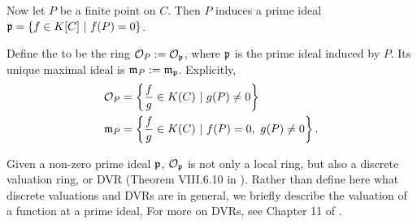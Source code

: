 Now let $P$ be a finite point on $C$. Then $P$ induces a prime ideal
$\frak p = \{ f \in K[C] ~|~ f(P) = 0 \}$.
\begin{comment}
\begin{proposition}
  Let $P$ be an affine point on a curve $C$ and let
  \[ \frak p = \{ f \in K[C] ~|~ f(P) = 0 \}. \]
  Then $\frak p$ is a non-zero prime ideal of $K[C]$.
\end{proposition}
\begin{proof}
  \begin{description}
    \item[$\frak p$ is non-zero:]
      Let $P = (x_0, y_0)$.
      Then $x_0$ is an element of some finite algebraic extension $L$ of $K$.
      Let $m(x)$ be the minimal polynomial of $x_0$.
      Then $m(x) \in K[x]$ is univariate, non-zero, and may be viewed instead as $m(x,y) \in K[x,y]$.
      Then $m(x_0, y_0) = m(x_0) = 0$, hence $m(x,y) \in \frak p$.
    \item[$\frak p$ is prime:]
      Suppose $fg \in \frak p$. Then
      \begin{align*}
        & (fg)(P) = 0 \\
        \implies & f(P)g(P) = 0 \\
        \implies & f(P) = 0 \text{ or } g(P) = 0 \\
        \implies & f \in \frak p \text{ or } g \in \frak p.
      \end{align*}
  \end{description}
\end{proof}
\end{comment}
Define the  to be the ring $\cal O_P := \cal O_{\frak p}$,
where $\frak p$ is the prime ideal induced by $P$.
Its unique maximal ideal is $\frak m_P := \frak m_{\frak p}$. Explicitly,
\begin{align*}
  \cal O_P &= \left\{ \frac f g \in K(C) ~|~ g(P) \neq 0 \right\} \\
  \frak m_P &= \left\{ \frac f g \in K(C) ~|~ f(P) = 0, ~g(P) \neq 0 \right\}.
\end{align*}

Given a non-zero prime ideal $\frak p$, $\cal O_{\frak p}$ is not only a local ring,
but also a discrete valuation ring, or DVR (Theorem VIII.6.10 in \cite{hungerford}).
Rather than define here what discrete valuations and DVRs are in general,
we briefly describe the valuation of a function at a prime ideal,
For more on DVRs, see Chapter 11 of \cite{eisenbud95}.

